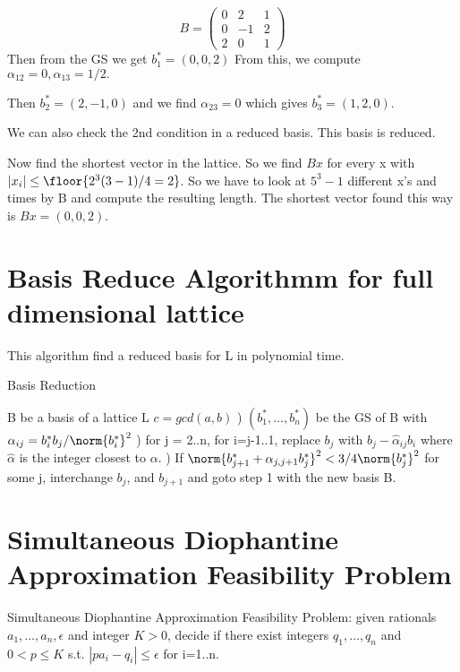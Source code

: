 \begin{example}
\[
B= \left(\begin{matrix}
0 & 2 & 1\\
0&-1 & 2\\
2& 0 &1
\end{matrix}\right)
\]
Then from the GS we get $b^*_1 = (0,0,2)$ From this, we compute $\alpha_{12}=0, \alpha_{13} =1/2.$ 

Then $b^*_2 = (2,-1,0)$ and we find $\alpha_{23}=0$ which gives $b^*_3 =(1,2,0)$.

We can also check the 2nd condition in a reduced basis. This basis is reduced. 

Now find the shortest vector in the lattice. So we find $Bx$ for every x with $|x_i| \leq \floor{2^3(3-1)/4 = 2}$. So we have to look at $5^3 -1$ different x's and times by B and compute the resulting length. The shortest vector found this way is $Bx = (0,0,2)$.
\end{example}

\section{Basis Reduce Algorithmm for full dimensional lattice}

This algorithm find a reduced basis for L in polynomial time.

\begin{algorithm}                      
\caption{Basis Reduction}
\label{alg:BasisReduction}
\begin{algorithmic}                    
\REQUIRE B be a basis of a lattice L
\ENSURE $c = gcd(a,b)$
) $(b^*_1, \dots, b^*_n)$ be the GS of B with $\alpha_{ij}= b^*_ib_j/\norm{b^*_i}^2$
) for j = 2..n, for i=j-1..1, replace $b_j$ with $b_j - \hat \alpha_{ij}b_i$ where $\hat \alpha$ is the integer closest to $\alpha$.
) If $\norm{b^*_{j+1} + \alpha_{j,j+1}b^*_j}^2 < 3/4 \norm{b^*_j}^2$ for some j, interchange $b_j$, and $b_{j+1}$ and goto step 1 with the new basis B.
\end{algorithmic}
\end{algorithm}


\section{Simultaneous Diophantine Approximation Feasibility Problem}


\begin{definition}
Simultaneous Diophantine Approximation Feasibility Problem: given rationals $a_1, \dots, a_n, \epsilon$ and integer $K > 0$, decide if there exist integers $q_1, \dots, q_n$ and $0 < p \leq K$ s.t. $|pa_i - q_i| \leq \epsilon$ for i=1..n.
\end{definition}

